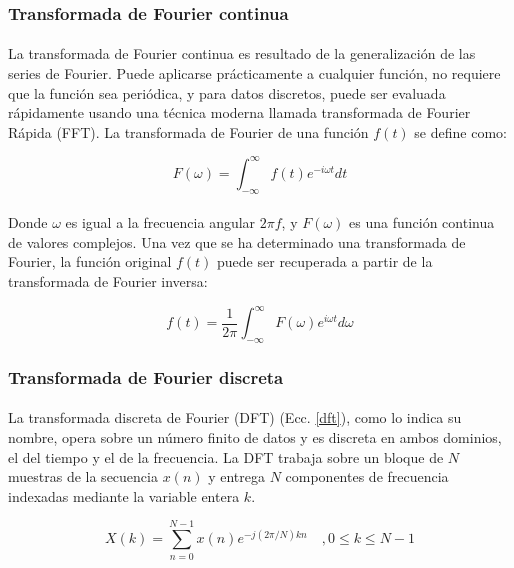 \documentclass[a4paper,12pt]{article}
\begin{document}
\subsubsection{Transformada de Fourier continua}
\paragraph{}
La transformada de Fourier continua es resultado de la generalización de las series de Fourier. Puede aplicarse prácticamente a cualquier función, no requiere que la función sea periódica, y para datos discretos, puede ser evaluada rápidamente usando una técnica moderna llamada transformada de Fourier Rápida (FFT). La transformada de Fourier de una función $f(t)$ se define \cite{anthony} como:

\begin{equation}
F(\omega)=\int_{-\infty}^{\infty}f(t)e^{-i{\omega}t}dt
\end{equation}

\paragraph{}
Donde $\omega$ es igual a la frecuencia angular $2{\pi}f$, y $F(\omega)$ es una función continua de valores complejos. Una vez que se ha determinado una transformada de Fourier, la función original $f(t)$ puede ser recuperada a partir de la transformada de Fourier inversa:

\begin{equation}
f(t)=\frac{1}{2\pi}\int_{-\infty}^{\infty}F(\omega)e^{i{\omega}t}d\omega
\end{equation}

\subsubsection{Transformada de Fourier discreta}

\paragraph{}
La transformada discreta de Fourier (DFT) (Ecc. \ref{dft}), como lo indica su nombre, opera sobre un número finito de datos y es discreta en ambos dominios, el del tiempo y el de la frecuencia. La DFT trabaja sobre un bloque de $N$ muestras de la secuencia $x(n)$ y entrega $N$ componentes de frecuencia indexadas mediante la variable entera $k$.

\begin{equation}
\label{dft}
X(k) = \sum_{n=0}^{N-1}x(n)e^{-j(2\pi/N)kn} \quad , 0 \leq k \leq N-1
\end{equation}
\end{document}
